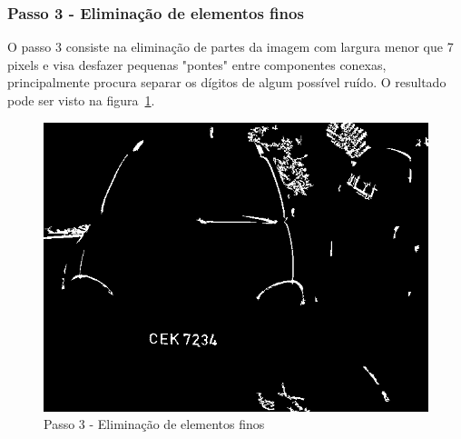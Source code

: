 \documentclass[11pt]{article} %
\begin{document}
\subsubsection{Passo 3 - Eliminação de elementos finos}
	O passo 3 consiste na eliminação de partes da imagem com largura menor que 7 pixels e visa desfazer pequenas "pontes" entre componentes conexas, principalmente procura separar os dígitos de algum possível ruído.
	 O resultado pode ser visto na figura~\ref{step2}.
	\begin{figure}[!h]
		\begin{center}
		\includegraphics[scale=0.5]{img_relatorio/step2.png}
		\caption{Passo 3 - Eliminação de elementos finos}\label{step2}
		\end{center}
	\end{figure}
\newpage
\end{document}
